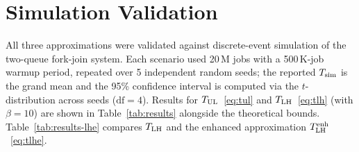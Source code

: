 \section{Simulation Validation}
\label{sec:validation}

All three approximations were validated against discrete-event simulation of the
two-queue fork-join system.
Each scenario used 20\,M jobs with a 500\,K-job warmup period, repeated over
5 independent random seeds; the reported $\Tsim$ is the grand mean and the
95\% confidence interval is computed via the $t$-distribution across seeds
($\mathrm{df}=4$).
Results for $T_{\text{UL}}$~\eqref{eq:tul} and $T_{\text{LH}}$~\eqref{eq:tlh} (with $\beta = 10$)
are shown in Table~\ref{tab:results} alongside the theoretical bounds.
Table~\ref{tab:results-lhe} compares $T_{\text{LH}}$ and the enhanced approximation
$T_{\text{LH}}^{\text{enh}}$~\eqref{eq:tlhe}.

\begin{table}[ht]
\centering
\caption{Approximations vs.\ simulation for heterogeneous two-queue fork-join.
         $\Tsim$ is the grand mean over 5 seeds; $\pm$ is the 95\% CI half-width.
         Errors are $(T_{\text{approx}} - \Tsim)/\Tsim \times 100\%$.}
\label{tab:results}
\end{table}

